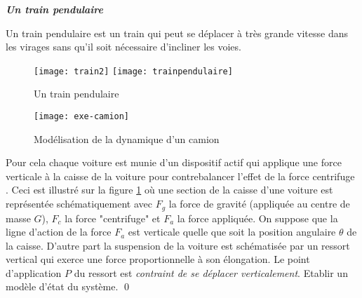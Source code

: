 \begin{exercice}{\bf \em Un train pendulaire}

Un train pendulaire est un train qui peut se déplacer à
très grande vitesse dans les virages sans qu'il soit nécessaire
d'incliner les voies. 
\begin{figure}[ht]
\begin{center}
\texttt{[image: train2]}
\texttt{[image: trainpendulaire]}
\caption{Un train pendulaire}
\label{Fig:train}
\end{center}
\end{figure}
\begin{figure}[!h]
\begin{center}
\texttt{[image: exe-camion]}
\caption{Modélisation de la dynamique d'un camion}
\label{Fig:exe-camion}
\end{center}
\end{figure}
Pour cela chaque voiture est munie d'un dispositif
actif qui applique une force verticale à la caisse de la voiture pour
contrebalancer l'effet de la force \og centrifuge \fg. Ceci est illustré sur
la figure \ref{Fig:train} où une section de la caisse d'une voiture est
représentée schématiquement avec $F_g$ la force de gravité
(appliquée au centre de masse $G$), $F_c$ la force "centrifuge" et
$F_a$ la force appliquée. On suppose que la ligne d'action de la force
$F_a$ est verticale quelle que soit la position angulaire $\theta$ de la
caisse. D'autre part la suspension de la voiture est schématisée par
un ressort vertical qui exerce une force proportionnelle à son
élongation. Le point d'application
$P$ du ressort est {\it contraint de se déplacer verticalement}.
Etablir un modèle d'état du système. \qed
\end{exercice}
\vv

